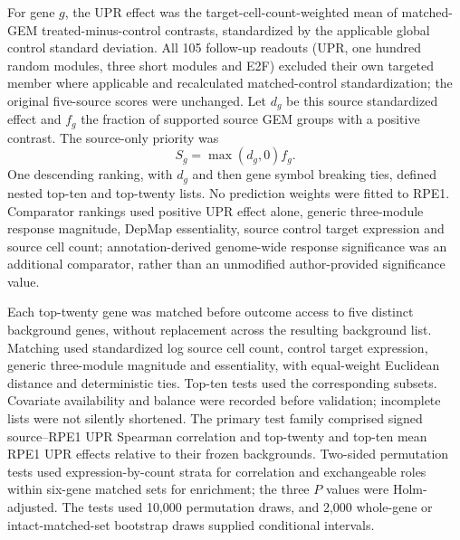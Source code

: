 \documentclass[a4paper,fleqn]{cas-sc}
\makeatletter
\DeclareRobustCommand{\rev}[1]{{\color{red}\def\@citecolor{black}\def\@linkcolor{red}\def\@urlcolor{red}#1}}
\makeatother
\begin{document}
\rev{For gene $g$, the UPR effect was the target-cell-count-weighted mean of matched-GEM treated-minus-control contrasts, standardized by the applicable global control standard deviation.} \rev{All 105 follow-up readouts (UPR, one hundred random modules, three short modules and E2F) excluded their own targeted member where applicable and recalculated matched-control standardization; the original five-source scores were unchanged.} \rev{Let $d_g$ be this source standardized effect and $f_g$ the fraction of supported source GEM groups with a positive contrast.} \rev{The source-only priority was
\begin{equation}
{S_g=\max(d_g,0)f_g.}
\end{equation}
One descending ranking, with $d_g$ and then gene symbol breaking ties, defined nested top-ten and top-twenty lists.} \rev{No prediction weights were fitted to RPE1.} \rev{Comparator rankings used positive UPR effect alone, generic three-module response magnitude, DepMap essentiality, source control target expression and source cell count; annotation-derived genome-wide response significance was an additional comparator, rather than an unmodified author-provided significance value.}

\rev{Each top-twenty gene was matched before outcome access to five distinct background genes, without replacement across the resulting background list.} \rev{Matching used standardized log source cell count, control target expression, generic three-module magnitude and essentiality, with equal-weight Euclidean distance and deterministic ties.} \rev{Top-ten tests used the corresponding subsets.} \rev{Covariate availability and balance were recorded before validation; incomplete lists were not silently shortened.} \rev{The primary test family comprised signed source--RPE1 UPR Spearman correlation and top-twenty and top-ten mean RPE1 UPR effects relative to their frozen backgrounds.} \rev{Two-sided permutation tests used expression-by-count strata for correlation and exchangeable roles within six-gene matched sets for enrichment; the three $P$ values were Holm-adjusted.} \rev{The tests used 10,000 permutation draws, and 2,000 whole-gene or intact-matched-set bootstrap draws supplied conditional intervals.}
\end{document}
